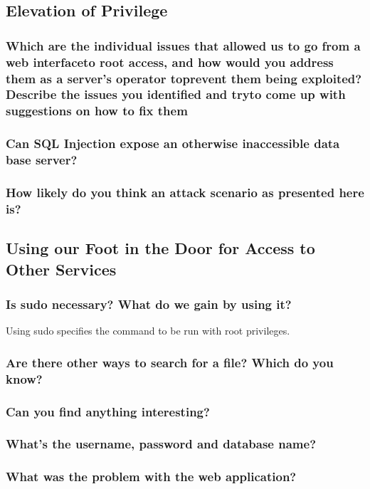 \subsection{Elevation of Privilege}
\subsubsection{Which are the individual issues that allowed us to go from a web interfaceto root access, and how would you address them as a server's operator toprevent them being exploited? Describe the issues you identified and tryto come up with suggestions on how to fix them}

\subsubsection{Can SQL Injection expose an otherwise inaccessible data base server?}

\subsubsection{How likely do you think an attack scenario as presented here is?}

\subsection{Using our Foot in the Door for Access to Other Services}
\subsubsection{Is sudo necessary? What do we gain by using it?}
Using sudo specifies the command to be run with root privileges.
\subsubsection{Are there other ways to search for a file? Which do you know?}

\subsubsection{Can you find anything interesting?}
\subsubsection{What's the username, password and database name?}
\subsubsection{What was the problem with the web application?}
